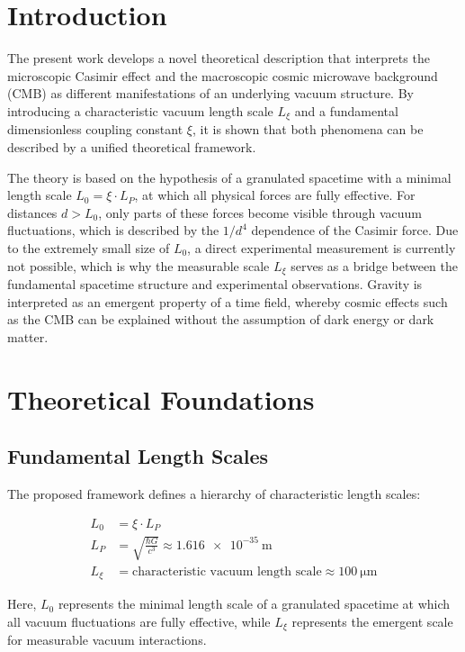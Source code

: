 	\section{Introduction}
	
	The present work develops a novel theoretical description that interprets the microscopic Casimir effect and the macroscopic cosmic microwave background (CMB) as different manifestations of an underlying vacuum structure. By introducing a characteristic vacuum length scale \( L_\xi \) and a fundamental dimensionless coupling constant \( \xi \), it is shown that both phenomena can be described by a unified theoretical framework.
	
	The theory is based on the hypothesis of a granulated spacetime with a minimal length scale \( L_0 = \xi \cdot L_P \), at which all physical forces are fully effective. For distances \( d > L_0 \), only parts of these forces become visible through vacuum fluctuations, which is described by the \( 1/d^4 \) dependence of the Casimir force. Due to the extremely small size of \( L_0 \), a direct experimental measurement is currently not possible, which is why the measurable scale \( L_\xi \) serves as a bridge between the fundamental spacetime structure and experimental observations. Gravity is interpreted as an emergent property of a time field, whereby cosmic effects such as the CMB can be explained without the assumption of dark energy or dark matter.
	
	\section{Theoretical Foundations}
	
	\subsection{Fundamental Length Scales}
	
	The proposed framework defines a hierarchy of characteristic length scales:
	
	\begin{align}
		L_0 &= \xi \cdot L_P \label{eq:L0_definition}\\
		L_P &= \sqrt{\frac{\hbar G}{c^3}} \approx \SI{1.616e-35}{\meter} \label{eq:planck_length}\\
		L_\xi &= \text{characteristic vacuum length scale} \approx \SI{100}{\micro\meter} \label{eq:Lxi_definition}
	\end{align}
	
	Here, \( L_0 \) represents the minimal length scale of a granulated spacetime at which all vacuum fluctuations are fully effective, while \( L_\xi \) represents the emergent scale for measurable vacuum interactions.
	

